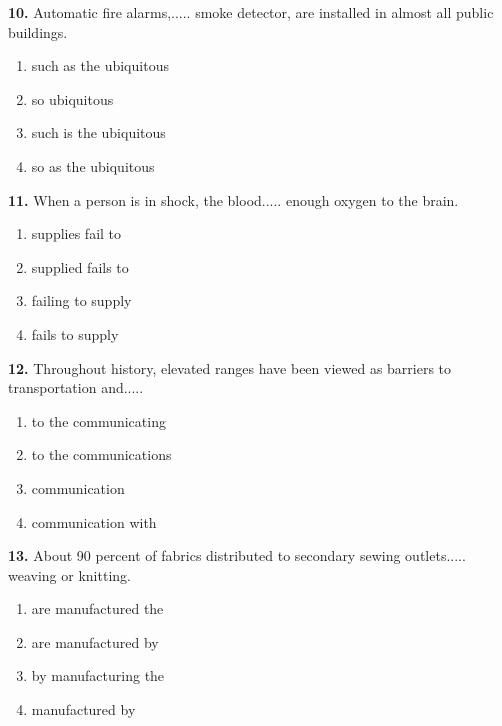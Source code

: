 \documentclass[12pt]{article}
\begin{document}
\par
\vspace{0.25\baselineskip}
\noindent\textbf{10.} Automatic fire alarms,..... smoke detector, are installed in almost all public buildings.
\begin{enumerate}[label=(\Alph*),leftmargin=*,itemsep=0.2em]
\item such as the ubiquitous
\item so ubiquitous
\item such is the ubiquitous
\item so as the ubiquitous
\end{enumerate}
\par
\vspace{0.25\baselineskip}
\noindent\textbf{11.} When a person is in shock, the blood..... enough oxygen to the brain.
\begin{enumerate}[label=(\Alph*),leftmargin=*,itemsep=0.2em]
\item supplies fail to
\item supplied fails to
\item failing to supply
\item fails to supply
\end{enumerate}
\par
\vspace{0.25\baselineskip}
\noindent\textbf{12.} Throughout history, elevated ranges have been viewed as barriers to transportation and.....
\begin{enumerate}[label=(\Alph*),leftmargin=*,itemsep=0.2em]
\item to the communicating
\item to the communications
\item communication
\item communication with
\end{enumerate}
\par
\vspace{0.25\baselineskip}
\noindent\textbf{13.} About 90 percent of fabrics distributed to secondary sewing outlets..... weaving or knitting.
\begin{enumerate}[label=(\Alph*),leftmargin=*,itemsep=0.2em]
\item are manufactured the
\item are manufactured by
\item by manufacturing the
\item manufactured by
\end{enumerate}
\par
\vspace{0.25\baselineskip}
\end{document}
